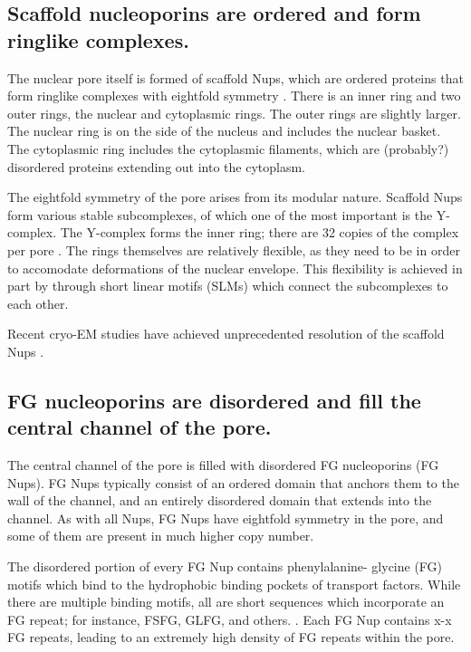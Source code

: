 \subsection{Scaffold nucleoporins are ordered and form ringlike complexes.}
The nuclear pore itself is formed of scaffold Nups, which are ordered proteins that form ringlike complexes with eightfold symmetry \cite{beck17}.  There is an inner ring and two outer rings, the nuclear and cytoplasmic rings.  The outer rings are slightly larger.  The nuclear ring is on the side of the nucleus and includes the nuclear basket.  The cytoplasmic ring includes the cytoplasmic filaments, which are (probably?) disordered proteins extending out into the cytoplasm.

The eightfold symmetry of the pore arises from its modular nature.  Scaffold Nups form various stable subcomplexes, of which one of the most important is the Y-complex.  The Y-complex forms the inner ring; there are 32 copies of the complex per pore \cite{beck17}.  The rings themselves are relatively flexible, as they need to be in order to accomodate deformations of the nuclear envelope.  This flexibility is achieved in part by through short linear motifs (SLMs) which connect the subcomplexes to each other.

Recent cryo-EM studies have achieved unprecedented resolution of the scaffold Nups \cite{rout study, other EM study}.


\subsection{FG nucleoporins are disordered and fill the central channel of the pore.}
The central channel of the pore is filled with disordered FG nucleoporins (FG Nups).  FG Nups typically consist of an ordered domain that anchors them to the wall of the channel, and an entirely disordered domain that extends into the channel.  As with all Nups, FG Nups have eightfold symmetry in the pore, and some of them are present in much higher copy number.

The disordered portion of every FG Nup contains phenylalanine- glycine (FG) motifs which 
bind to the hydrophobic binding pockets of transport factors.  While there are multiple binding motifs, all are short sequences which incorporate an FG repeat; for instance, FSFG, GLFG, and others. \cite{the rout paper I took that figure from}.  Each FG Nup contains x-x FG repeats, leading to an extremely high density of FG repeats within the pore.


